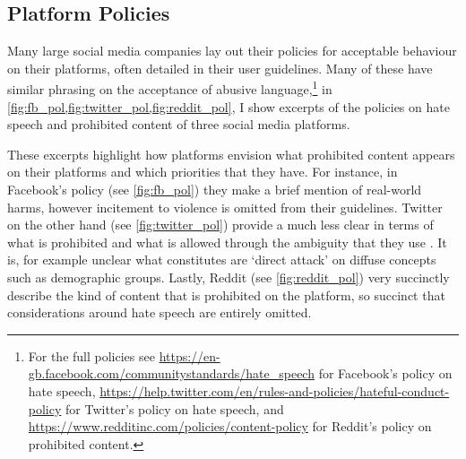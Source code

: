 \subsection{Platform Policies}

Many large social media companies lay out their policies for acceptable behaviour on their platforms, often detailed in their user guidelines.
Many of these have similar phrasing on the acceptance of abusive language,\footnote{For the full policies see \url{https://en-gb.facebook.com/communitystandards/hate_speech} for Facebook's policy on hate speech, \url{https://help.twitter.com/en/rules-and-policies/hateful-conduct-policy} for Twitter's policy on hate speech, and \url{https://www.redditinc.com/policies/content-policy} for Reddit's policy on prohibited content.} in \cref{fig:fb_pol,fig:twitter_pol,fig:reddit_pol}, I show excerpts of the policies on hate speech and prohibited content of three social media platforms.

These excerpts highlight how platforms envision what prohibited content appears on their platforms and which priorities that they have.
For instance, in Facebook's policy (see \cref{fig:fb_pol}) they make a brief mention of real-world harms, however incitement to violence is omitted from their guidelines.
Twitter on the other hand (see \cref{fig:twitter_pol}) provide a much less clear in terms of what is prohibited and what is allowed through the ambiguity that they use \citep{Kirtz:2022}.
It is, for example unclear what constitutes are `direct attack' on diffuse concepts such as demographic groups.
Lastly, Reddit (see \cref{fig:reddit_pol}) very succinctly describe the kind of content that is prohibited on the platform, so succinct that considerations around hate speech are entirely omitted.

